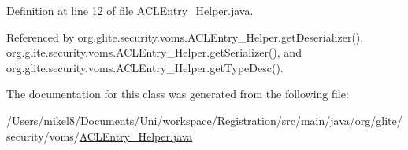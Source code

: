 Definition at line 12 of file ACLEntry\_\-Helper.java.



Referenced by org.glite.security.voms.ACLEntry\_\-Helper.getDeserializer(), org.glite.security.voms.ACLEntry\_\-Helper.getSerializer(), and org.glite.security.voms.ACLEntry\_\-Helper.getTypeDesc().



The documentation for this class was generated from the following file:\begin{DoxyCompactItemize}
\item 
/Users/mikel8/Documents/Uni/workspace/Registration/src/main/java/org/glite/security/voms/\hyperlink{ACLEntry__Helper_8java}{ACLEntry\_\-Helper.java}\end{DoxyCompactItemize}
